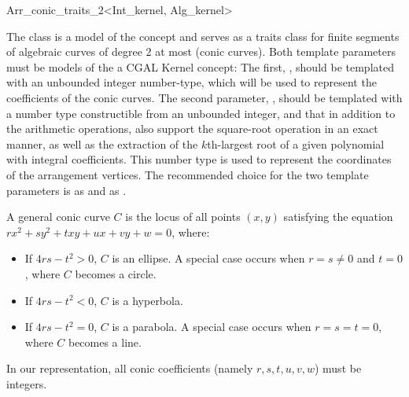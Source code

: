 
\ccRefPageBegin

\begin{ccRefClass}{Arr_conic_traits_2<Int_kernel, Alg_kernel>}

\ccDefinition
    The class 
    is a model of the  concept and serves as a 
    traits class for finite segments of algebraic curves of degree 2 at most
    (conic curves).
    Both template parameters must be models of the a CGAL Kernel 
    concept: The first, , should be templated with an 
    unbounded integer number-type, which will be used to represent the
    coefficients of the conic curves. The second parameter, ,
    should be templated with a number type constructible from an unbounded
    integer, and that in addition to the arithmetic operations, also support
    the square-root operation in an exact manner, as well as the extraction
    of the $k$th-largest root of a given polynomial with integral coefficients.
    This number type is used to represent the coordinates of the arrangement
    vertices. The recommended choice for the two template parameters is
     as  and
     as .

    A general conic curve $C$ is the locus of all points $(x,y)$ satisfying the
    equation $rx^2 + sy^2 + txy + ux + vy + w = 0$, where:
    \begin{itemize}
    \item If $4rs - t^2 > 0$, $C$ is an ellipse. A special case occurs when
          $r = s \neq 0$ and $t = 0$, where $C$ becomes a circle.
    \item If $4rs - t^2 < 0$, $C$ is a hyperbola.
    \item If $4rs - t^2 = 0$, $C$ is a parabola. A special case occurs when
          $r = s = t = 0$, where $C$ becomes a line. 
    \end{itemize}
    In our representation, all conic coefficients (namely $r,s,t,u,v,w$) must
    be integers.


\end{ccRefClass}
